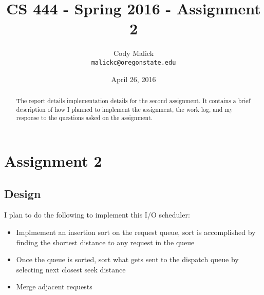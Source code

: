 \documentclass[10pt,letterpaper,onecolumn,draftclsnofoot]{IEEEtran}
\begin{document}
\begin{titlepage}
  \title{CS 444 - Spring 2016 - Assignment 2}
  \author{Cody Malick\\
  \texttt{malickc@oregonstate.edu}}
  \date{April 26, 2016}
  \maketitle
  \vspace*{2cm}
  \begin{abstract}
      \noindent The report details implementation details for the second assignment.
      It contains a brief description of how I planned to implement the assignment,
      the work log, and my response to the questions asked on the assignment. \end{abstract}

\end{titlepage}

\tableofcontents
\clearpage

\section{Assignment 2}
  \subsection{Design}
I plan to do the following to implement this I/O scheduler:
\begin{itemize}
	\item Implmement an insertion sort on the request queue, sort is
		accomplished by finding the shortest distance to any request in
		the queue
	\item Once the queue is sorted, sort what gets sent to the dispatch
		queue by selecting next closest seek distance
	\item Merge adjacent requests

\end{itemize}
\end{document}
